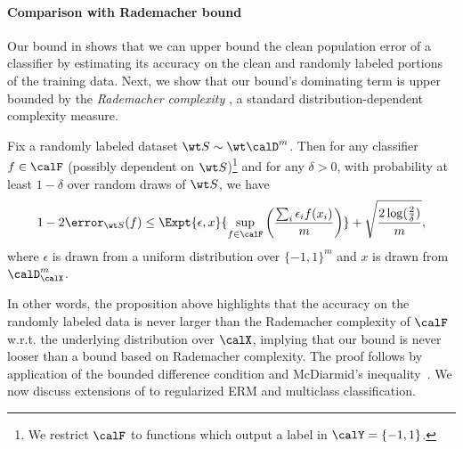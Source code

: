 
\paragraph{Comparison with Rademacher bound}
Our bound in   
shows that we can upper bound
the clean population error of a classifier 
by estimating 
its accuracy on the clean and 
randomly labeled portions of the training data. 
Next, we show that our bound's
dominating term 
is upper bounded by the \emph{Rademacher complexity} \citep{shalev2014understanding},
a standard distribution-dependent complexity measure.

\begin{prop} \label{prop:rademacher}
    Fix a randomly labeled dataset $\wt S \sim \wt \calD^m$. 
    Then for any classifier $f \in \calF$ 
    (possibly dependent on $\wt S$)\footnote{We 
    restrict $\calF$ to functions which output
    a label in $\calY = \{-1,1\}$.} 
    and for any $\delta >0$, 
    with probability at least $1-\delta$ 
    over random draws of $\wt S$,
    we have 
    \begin{align*}
        1 - 2\error_{\wt S}(f) \le \Expt{\epsilon,x}{\sup_{f\in \calF} \left( \frac{\sum_i \epsilon_i f(x_i)}{m} \right) } + \sqrt{\frac{2\log(\frac{2}{\delta})}{m}},
    \end{align*} 
    where $\epsilon$ is drawn 
    from a uniform distribution over $\{-1, 1\}^m$ 
    and $x$ is drawn from $\calD_\calX^m$.      
\end{prop}

In other words, the proposition above highlights that the accuracy 
on the randomly labeled data 
is never larger than the Rademacher complexity of $\calF$ 
w.r.t. the underlying distribution over $\calX$, 
implying that our bound is never looser 
than a bound based on Rademacher complexity.
The proof follows 
by application 
of the bounded difference condition 
and McDiarmid’s inequality~\citep{mcdiarmid1989}. 
We now discuss extensions 
of  
to regularized ERM
and multiclass classification. 


